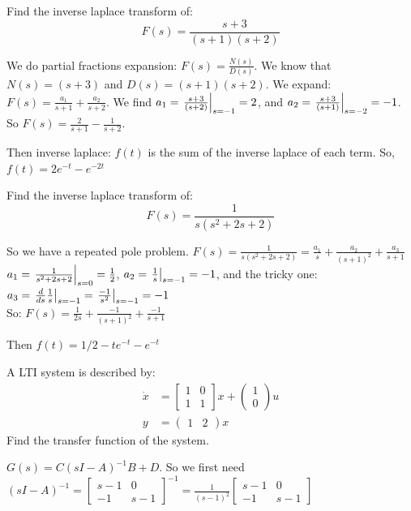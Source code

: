 \documentclass[11pt]{article}
\begin{document}
Find the inverse laplace transform of:
$$
F(s) = \frac{s + 3}{(s+1)(s+2)}
$$
\soln

We do partial fractions expansion:
$F(s) = \frac{N(s)}{D(s)}$.
We know that $N(s) = (s+3)$ and $D(s) = (s+1)(s+2)$.
We expand: $F(s) = \frac{a_1}{s+1} + \frac{a_2}{s+2}$.
We find $a_1 = \left.\frac{s + 3}{(s+2)}\right\rvert_{s=-1}^{} = 2$,
and $a_2 = \left.\frac{s + 3}{(s+1)}\right\rvert_{s=-2}^{} = -1$.
So $F(s) = \frac{2}{s+1} - \frac{1}{s+2}$.

Then inverse laplace:
$f(t)$ is the sum of the inverse laplace of each term.
So, $f(t) = 2e^{-t} - e^{-2t}$





Find the inverse laplace transform of:
$$
F(s) = \frac{1}{s(s^2 + 2s +2)}
$$
\soln

So we have a repeated pole problem. 
$F(s) = \frac{1}{s(s^2 + 2s +2)} = \frac{a_1}{s} + \frac{a_2}{(s+1)^2} + \frac{a_3}{s+1}$
$a_1 = \left.\frac{1}{s^2 + 2s + 2}\right\rvert_{s=0}^{} = \frac{1}{2}$,
$a_2 = \left.\frac{1}{s}\right\rvert_{s=-1}^{} = -1$,
and the tricky one: $a_3 = \left.\frac{d}{ds} \frac{1}{s}\right\rvert_{s=-1}^{} = \left.\frac{-1}{s^2}\right\rvert_{s=-1}^{} = -1$\\
So: $F(s) = \frac{1}{2s} + \frac{-1}{(s+1)^2} + \frac{-1}{s+1}$

Then $f(t) = 1/2 - t e^{-t} - e^{-t}$


A LTI system is described by:
\begin{align*}
    \dot{x} &= \begin{bmatrix}
        1&0\\1&1
    \end{bmatrix}x + \begin{pmatrix}
        1\\0
    \end{pmatrix}u \\
    y &= \begin{pmatrix}
        1 & 2
    \end{pmatrix} x
\end{align*}
Find the transfer function of the system.

\soln

$G(s) = C(sI - A)^{-1}B + D$.
So we first need $(sI - A)^{-1} = \begin{bmatrix}
    s-1 & 0\\-1 & s-1
\end{bmatrix}^{-1} = \frac{1}{(s-1)^2}\begin{bmatrix}
    s-1 & 0\\-1 & s-1
\end{bmatrix}$
\end{document}
